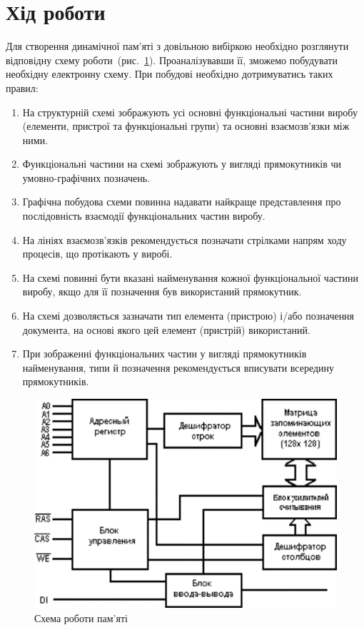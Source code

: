 \documentclass[a4paper, oneside, DIV = 12, 12pt, headings = normal]{scrartcl}
\begin{document}
		\section{Хід роботи}
			Для створення динамічної пам'\-яті з довільною вибіркою необхідно розглянути відповідну схему роботи~(рис.~\ref{fig:memory-working-principle-schematic}). Проаналізувавши її, зможемо побудувати необхідну електронну схему. При побудові необхідно дотримуватись таких правил:
			\begin{enumerate}
				\item На структурній схемі зображують усі основні функціональні частини виробу (елементи, пристрої та функціональні групи) та основні взаємозв'язки між ними. 
				\item Функціональні частини на схемі зображують у вигляді прямокутників чи умовно-графічних позначень.
				\item Графічна побудова схеми повинна надавати найкраще представлення про послідовність взаємодії функціональних частин виробу.
				\item На лініях взаємозв'язків рекомендується позначати стрілками напрям ходу процесів, що протікають у виробі.
				\item На схемі повинні бути вказані найменування кожної функціональної частини виробу, якщо для її позначення був використаний прямокутник.
				\item На схемі дозволяється зазначати тип елемента (пристрою) і/або позначення документа, на основі якого цей елемент (пристрій) використаний.
				\item При зображенні функціональних частин у вигляді прямокутників найменування, типи й позначення рекомендується вписувати всередину прямокутників.
			\end{enumerate}
			\begin{figure}[!htbp]
				\centering
					\includegraphics[height = 11\baselineskip]{./assets/01.png}
				\caption{Схема роботи пам'\-яті}
				\label{fig:memory-working-principle-schematic}
			\end{figure}
\end{document}

